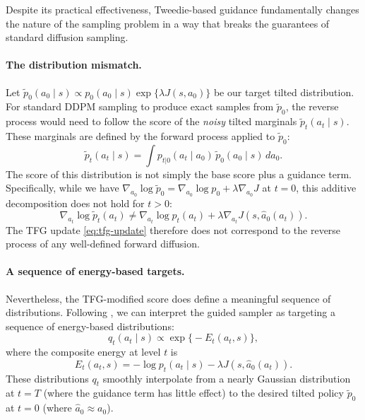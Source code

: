\documentclass{article}
\theoremstyle{plain}
\theoremstyle{definition}
\theoremstyle{remark}
\begin{document}
Despite its practical effectiveness, Tweedie-based guidance fundamentally changes the nature of the sampling problem in a way that breaks the guarantees of standard diffusion sampling.

\paragraph{The distribution mismatch.}
Let $\tilde{p}_0(a_0 \mid s) \propto p_0(a_0 \mid s) \exp\{\lambda J(s, a_0)\}$ be our target tilted distribution.
For standard DDPM sampling to produce exact samples from $\tilde{p}_0$, the reverse process would need to follow the score of the \emph{noisy} tilted marginals $\tilde{p}_t(a_t \mid s)$.
These marginals are defined by the forward process applied to $\tilde{p}_0$:
\begin{equation}
  \tilde{p}_t(a_t \mid s) = \int p_{t|0}(a_t \mid a_0)\, \tilde{p}_0(a_0 \mid s)\, da_0.
  \label{eq:tilted-marginal}
\end{equation}
The score of this distribution is not simply the base score plus a guidance term.
Specifically, while we have $\nabla_{a_0} \log \tilde{p}_0 = \nabla_{a_0} \log p_0 + \lambda \nabla_{a_0} J$ at $t=0$, this additive decomposition does not hold for $t > 0$:
\begin{equation}
  \nabla_{a_t} \log \tilde{p}_t(a_t) \neq \nabla_{a_t} \log p_t(a_t) + \lambda \nabla_{a_t} J(s, \hat{a}_0(a_t)).
  \label{eq:score-mismatch}
\end{equation}
The TFG update \cref{eq:tfg-update} therefore does not correspond to the reverse process of any well-defined forward diffusion.

\paragraph{A sequence of energy-based targets.}
Nevertheless, the TFG-modified score does define a meaningful sequence of distributions.
Following \citet{du2023reduce_reuse_recycle}, we can interpret the guided sampler as targeting a sequence of energy-based distributions:
\begin{equation}
  q_t(a_t \mid s) \propto \exp\bigl\{-E_t(a_t, s)\bigr\},
  \label{eq:energy-sequence}
\end{equation}
where the composite energy at level $t$ is
\begin{equation}
  E_t(a_t, s) = -\log p_t(a_t \mid s) - \lambda J(s, \hat{a}_0(a_t)).
  \label{eq:composite-energy}
\end{equation}
These distributions $q_t$ smoothly interpolate from a nearly Gaussian distribution at $t=T$ (where the guidance term has little effect) to the desired tilted policy $\tilde{p}_0$ at $t=0$ (where $\hat{a}_0 \approx a_0$).
\end{document}
